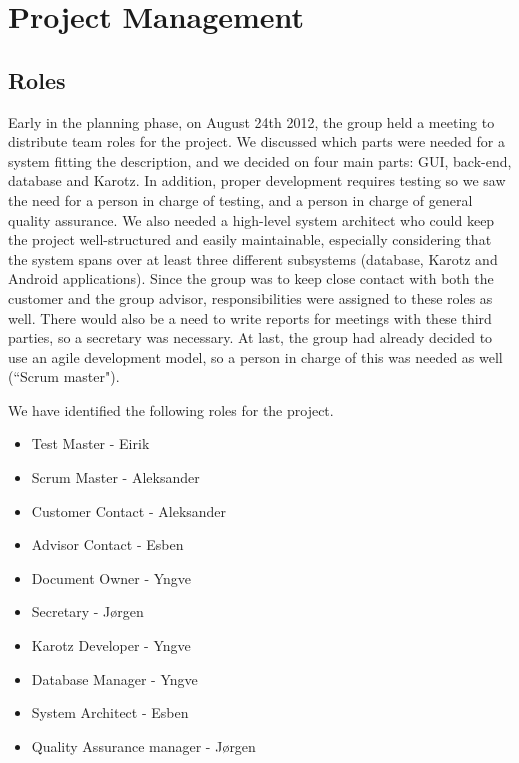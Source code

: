 \chapter{Project Management}
\label{chap:projectManagement}



%

\section{Roles}
Early in the planning phase, on August 24th 2012, the group held a meeting to distribute
team roles for the project. We discussed which parts were needed for a system fitting the description,
and we decided on four main parts: GUI, back-end, database and Karotz. In addition, proper development
requires testing so we saw the need for a person in charge of testing, and a person in charge of
general quality assurance. We also needed a high-level system architect who could keep the
project well-structured and easily maintainable, especially considering that the system spans over
at least three different subsystems (database, Karotz and Android applications). Since the group was to keep
close contact with both the customer and the group advisor, responsibilities were assigned to these
roles as well. There would also be a need to write reports for meetings with these third parties, so
a secretary was necessary. At last, the group had already decided to use an agile 
development model, so a person in charge of this was needed as well (``Scrum master").

We have identified the following roles for the project. 
\begin{itemize}
\item Test Master - Eirik
\item Scrum Master - Aleksander
\item Customer Contact - Aleksander
\item Advisor Contact - Esben
\item Document Owner - Yngve
\item Secretary - Jørgen
\item Karotz Developer - Yngve
\item Database Manager - Yngve
\item System Architect - Esben
\item Quality Assurance manager - Jørgen 
\end{itemize}


